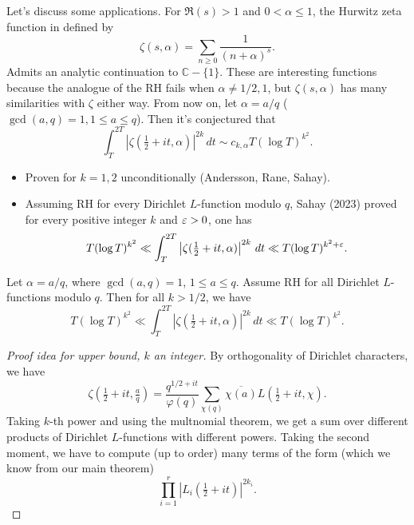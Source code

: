 \documentclass[reqno]{amsart} 
\begin{document}
Let's discuss some applications.  For $\Re(s) > 1$ and $0 < \alpha \leq 1$, the Hurwitz zeta function in defined by
\begin{equation*}
  \zeta(s, \alpha) = \sum_{n \geq 0} \frac{1}{(n + \alpha)^s}.
\end{equation*}
Admits an analytic continuation to $\mathbb{C} - \{1\}$.  These are interesting functions because the analogue of the RH fails when $\alpha \neq 1/2, 1$, but $\zeta(s, \alpha)$ has many similarities with $\zeta$ either way.  From now on, let $\alpha = a/q$ ($\gcd(a, q) = 1, 1 \leq a \leq q$).  Then it's conjectured that
\begin{equation*}
  \int_T^{2 T} \left| \zeta(\tfrac{1}{2} + i t, \alpha) \right|^{2 k}
  \, d t
  \sim c_{k, \alpha} T(\log T)^{k^2}.
\end{equation*}
\begin{itemize}
\item Proven for $k = 1, 2$ unconditionally (Andersson, Rane, Sahay).  
\item Assuming RH for every Dirichlet $L$-function modulo $q$, Sahay (2023) proved for every positive integer $k$ and $\varepsilon > 0$, one has
  \begin{equation*}
    T(\log T)^{k^2} \ll \int_T^{2 T}
    \left| \zeta(\tfrac{1}{2} + i t, \alpha) \right|^{2 k} \, d t
    \ll
    T(\log T)^{k^2 + \varepsilon}.
  \end{equation*}
\end{itemize}
\begin{theorem}[H.\ 2024+]
  Let $\alpha = a/q$, where $\gcd(a, q) = 1$, $1 \leq a \leq q$.  Assume RH for all Dirichlet $L$-functions modulo $q$.  Then for all $k > 1/2$, we have
  \begin{equation*}
    T(\log T)^{k^2} \ll \int_T^{2 T}
    \left| \zeta(\tfrac{1}{2} + i t, \alpha) \right|^{2 k} \, d t
    \ll
    T(\log T)^{k^2}.
  \end{equation*}
\end{theorem}
\begin{proof}[Proof idea for upper bound, $k$ an integer]
  By orthogonality of Dirichlet characters, we have
  \begin{equation*}
    \zeta(\tfrac{1}{2} + i t, \tfrac{a}{q})
    =
    \frac{q    ^{1/2 + i t}}{\varphi(q)}
    \sum_{\chi(q)} \overline{\chi(a)}
    L(\tfrac{1}{2} + i t, \chi).
  \end{equation*}
  Taking $k$-th power and using the multnomial theorem, we get a sum over different products of Dirichlet $L$-functions with different powers.  Taking the second moment, we have to compute (up to order) many terms of the form (which we know from our main theorem)
  \begin{equation*}
    \prod_{i = 1}^r
    \left| L_i(\tfrac{1}{2} + it) \right|^{2 k_i}.
  \end{equation*}
\end{proof}
\end{document}
